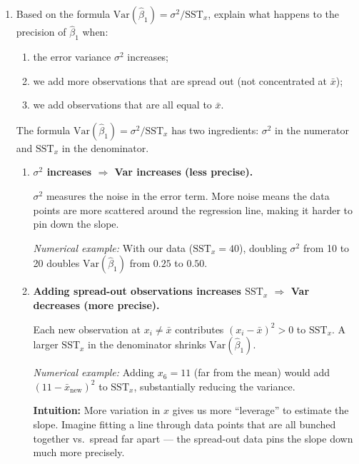 \documentclass[11pt,a4paper]{article}
\begin{document}
\begin{enumerate}[label=(\alph*)]
\begin{solution}
\textbf{Interpretation:} Across repeated samples with these same $x$-values, the OLS slope estimate $\hat{\beta}_1$ would have a standard deviation of $0.5$ --- on average, our estimates will be about $0.5$ units away from the true $\beta_1$.
\end{solution}

\item Based on the formula $\text{Var}(\hat{\beta}_1) = \sigma^2/\text{SST}_x$, explain what happens to the precision of $\hat{\beta}_1$ when:
\begin{enumerate}[label=(\roman*)]
  \item the error variance $\sigma^2$ increases;
  \item we add more observations that are spread out (not concentrated at $\bar{x}$);
  \item we add observations that are all equal to $\bar{x}$.
\end{enumerate}

\begin{solution}
The formula $\text{Var}(\hat{\beta}_1) = \sigma^2/\text{SST}_x$ has two ingredients: $\sigma^2$ in the numerator and $\text{SST}_x$ in the denominator.

\begin{enumerate}[label=(\roman*)]
  \item \textbf{$\sigma^2$ increases $\Longrightarrow$ Var increases (less precise).}

  $\sigma^2$ measures the noise in the error term. More noise means the data points are more scattered around the regression line, making it harder to pin down the slope.

  \emph{Numerical example:} With our data ($\text{SST}_x = 40$), doubling $\sigma^2$ from 10 to 20 doubles $\text{Var}(\hat{\beta}_1)$ from $0.25$ to $0.50$.

  \item \textbf{Adding spread-out observations increases $\text{SST}_x$ $\Longrightarrow$ Var decreases (more precise).}

  Each new observation at $x_i \ne \bar{x}$ contributes $(x_i - \bar{x})^2 > 0$ to $\text{SST}_x$. A larger $\text{SST}_x$ in the denominator shrinks $\text{Var}(\hat{\beta}_1)$.

  \emph{Numerical example:} Adding $x_6 = 11$ (far from the mean) would add $(11 - \bar{x}_{\text{new}})^2$ to $\text{SST}_x$, substantially reducing the variance.

  \textbf{Intuition:} More variation in $x$ gives us more ``leverage'' to estimate the slope. Imagine fitting a line through data points that are all bunched together vs.\ spread far apart --- the spread-out data pins the slope down much more precisely.


\end{enumerate}
\end{solution}
\end{enumerate}
\end{document}

